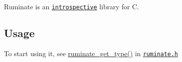 Ruminate is an \href{http://en.wikipedia.org/wiki/Introspection_(computer_science)}{\tt introspective} library for C.

\subsection*{Usage}

To start using it, see \hyperlink{ruminate_2ruminate_8h_a1d17861ce087a20632d29f3b6e09dccb}{ruminate\-\_\-get\-\_\-type()} in \href{http://rus.har.mn/ruminate/ruminate_2ruminate_8h.html}{\tt ruminate.\-h} 